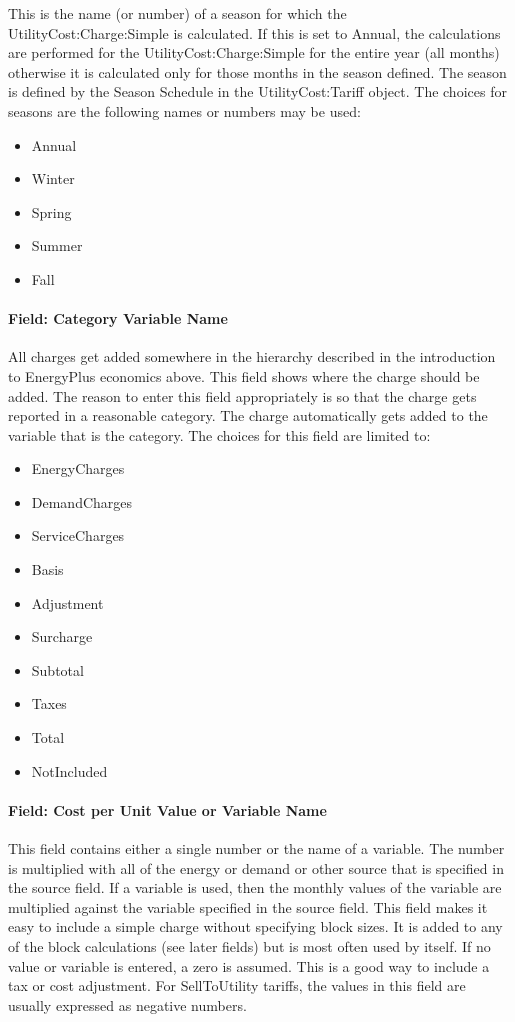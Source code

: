 This is the name (or number) of a season for which the UtilityCost:Charge:Simple is calculated. If this is set to Annual, the calculations are performed for the UtilityCost:Charge:Simple for the entire year (all months) otherwise it is calculated only for those months in the season defined. The season is defined by the Season Schedule in the UtilityCost:Tariff object. The choices for seasons are the following names or numbers may be used:

\begin{itemize}
\item
  Annual
\item
  Winter
\item
  Spring
\item
  Summer
\item
  Fall
\end{itemize}

\paragraph{Field: Category Variable Name}\label{field-category-variable-name-000}

All charges get added somewhere in the hierarchy described in the introduction to EnergyPlus economics above. This field shows where the charge should be added. The reason to enter this field appropriately is so that the charge gets reported in a reasonable category. The charge automatically gets added to the variable that is the category. The choices for this field are limited to:

\begin{itemize}
\item
  EnergyCharges
\item
  DemandCharges
\item
  ServiceCharges
\item
  Basis
\item
  Adjustment
\item
  Surcharge
\item
  Subtotal
\item
  Taxes
\item
  Total
\item
  NotIncluded
\end{itemize}

\paragraph{Field: Cost per Unit Value or Variable Name}\label{field-cost-per-unit-value-or-variable-name}

This field contains either a single number or the name of a variable. The number is multiplied with all of the energy or demand or other source that is specified in the source field. If a variable is used, then the monthly values of the variable are multiplied against the variable specified in the source field. This field makes it easy to include a simple charge without specifying block sizes. It is added to any of the block calculations (see later fields) but is most often used by itself. If no value or variable is entered, a zero is assumed. This is a good way to include a tax or cost adjustment. For SellToUtility tariffs, the values in this field are usually expressed as negative numbers.
